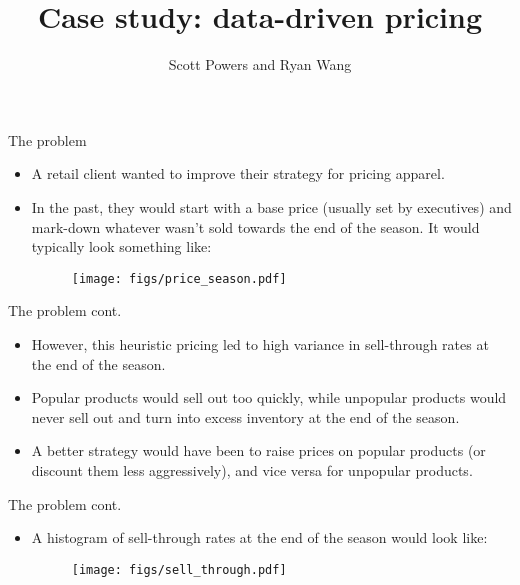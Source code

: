 \documentclass{beamer}
\title{Case study: data-driven pricing}
\author{Scott Powers and Ryan Wang}
\begin{document}


\begin{frame}
\titlepage
\end{frame}

\begin{frame}[fragile]{The problem}
\begin{itemize}
	\item A retail client wanted to improve their strategy for pricing apparel. 
	\item In the past, they would start with a base price (usually set by executives) and mark-down whatever wasn't sold towards the end of the season. It would typically look something like:
  \begin{figure}
    \texttt{[image: figs/price\_season.pdf]}
  \end{figure}
\end{itemize}
\end{frame}

\begin{frame}{The problem cont.}
\begin{itemize}
	\item However, this heuristic pricing led to high variance in sell-through rates at the end of the season.
	\item Popular products would sell out too quickly, while unpopular products would never sell out and turn into excess inventory at the end of the season.
	\item A better strategy would have been to raise prices on popular products (or discount them less aggressively), and vice versa for unpopular products.
\end{itemize}
\end{frame}

\begin{frame}{The problem cont.}
\begin{itemize}
  \item A histogram of sell-through rates at the end of the season would look like:
  \begin{figure}
    \texttt{[image: figs/sell\_through.pdf]}
  \end{figure}
\end{itemize}
\end{frame}
\end{document}
